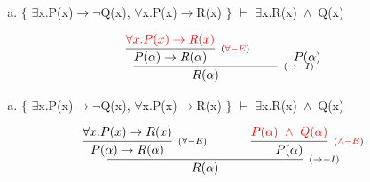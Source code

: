 \documentclass[aspectratio=43]{beamer}
\newcommand{\ria}{$\rightarrow$}
\newcommand{\fall}{$\forall$}
\newcommand{\ex}{$\exists$}
\newcommand{\nao}{$\neg$}
\newcommand{\andd}{$\wedge$}
\begin{document}
     \begin{frame}[fragile]
    
    	\begin{enumerate}[d)]
			\item $\{$ \ex x.P(x)\ria \nao Q(x), \fall x.P(x)\ria R(x) $\}$ $\vdash$ \ex x.R(x)\ \andd\ Q(x) \\
		\end{enumerate}
        
        \vspace{70pt}
        
        \[
        \begin{array}{c}
		
        	\infer[_{(\to -I)}]
            	{R(\alpha)}
            	{\infer[_{(\textcolor{red}{\forall -E})}]
                	{P(\alpha) \rightarrow R(\alpha)} 
                    {\textcolor{red}{\forall x.P(x)\to R(x)}} 
            	\hspace{35pt}
                P(\alpha)
                }
		\end{array}
        \]
        
	\end{frame}
    
    \begin{frame}[fragile]
    
    	\begin{enumerate}[d)]
			\item $\{$ \ex x.P(x)\ria \nao Q(x), \fall x.P(x)\ria R(x) $\}$ $\vdash$ \ex x.R(x)\ \andd\ Q(x) \\
		\end{enumerate}
        
        \vspace{70pt}
        
        \[
        \begin{array}{c}
		
        	\infer[_{(\to -I)}]
            	{R(\alpha)}
            	{\infer[_{(\forall -E)}]
                	{P(\alpha) \rightarrow R(\alpha)} 
                    {\forall x.P(x)\to R(x)} 
            	\hspace{35pt}
                \infer[_{(\textcolor{red}{\land -E})}] 
                	{P(\alpha)}
                    {\textcolor{red}{P(\alpha)\ \land \ Q(\alpha)}}
                }
		\end{array}
        \]
        
	\end{frame}
    
\end{document}
